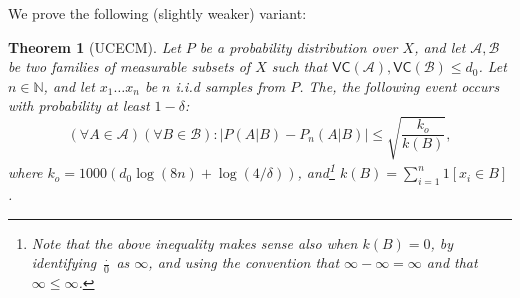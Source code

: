 \documentclass{article}
\def\B{{\mathcal B}}
\newcommand{\cA}{\mathcal{A}}
\newcommand{\cB}{\mathcal{B}}
\newtheorem{theorem}{Theorem}
\begin{document}
We prove the following (slightly weaker) variant:
\begin{theorem}[UCECM]\label{thm:UCECM}
Let $P$ be a probability distribution over $X$, and let $\cA,\cB$
be two families of measurable subsets of $X$ such that $\mathsf{VC}(\cA),\mathsf{VC}(\cB)\leq d_0$.
Let $n\in\mathbb{N}$, and let $x_1\ldots x_n$ be $n$ i.i.d samples from $P$.
The, the following event occurs with probability at least $1-\delta$:
\[\left(\forall A\in\cA\right)\left(\forall B\in\B\right):\left\lvert P(A \vert B) - P_n(A \vert B) \right\rvert \leq 
\sqrt{\frac{k_o}{k(B)}},\]
where $k_o = 1000 \left(d_0 \log(8n) + \log(4/\delta)\right)$, and\footnote{Note that the above inequality makes sense also when $k(B)=0$,
by identifying $\frac{\cdot}{0}$ as $\infty$, and using the convention that $\infty-\infty=\infty$ and that $\infty\leq \infty$.} $k(B) = \sum_{i=1}^n 1[x_i\in B]$.
\end{theorem}
\end{document}
